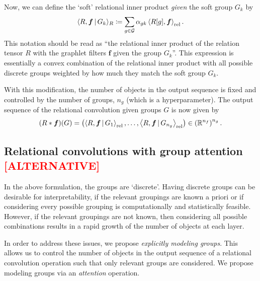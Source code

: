 Now, we can define the `soft' relational inner product \textit{given} the soft group $G_k$ by
\begin{equation}\label{eq:soft_relational_inner_prod}
    \langle R, \boldsymbol{f} \, \vert \, G_k \rangle_R \coloneqq \sum_{g \in {\mathcal{G}}} \alpha_{gk} \left \langle R[g], \boldsymbol{f} \right\rangle_\mathrm{rel}.
\end{equation}
This notation should be read as ``the relational inner product of the relation tensor $R$ with the graphlet filters $\boldsymbol{f}$ given the group $G_k$''. This expression is essentially a convex combination of the relational inner product with all possible discrete groups weighted by how much they match the soft group $G_k$.

With this modification, the number of objects in the output sequence is fixed and controlled by the number of groups, $n_g$ (which is a hyperparameter). The output sequence of the relational convolution given groups $G$ is now given by
\begin{equation}\label{eq:soft_relational_convolution_groups}
    (R \ast \bm{f})(G) = \left( \left\langle R, \bm{f} \, \vert \, G_1 \right\rangle_\mathrm{rel}, \ldots, \left\langle R, \bm{f} \, \vert \, G_{n_g} \right\rangle_\mathrm{rel} \right) \in \left(\mathbb{R}^{n_f}\right)^{n_g}.
\end{equation}

\subsection{Relational convolutions with group attention \textcolor{red}{[ALTERNATIVE]}}

In the above formulation, the groups are `discrete'. Having discrete groups can be desirable for interpretability, if the relevant groupings are known a priori or if considering every possible grouping is computationally and statistically feasible. However, if the relevant groupings are not known, then considering all possible combinations results in a rapid growth of the number of objects at each layer.

In order to address these issues, we propose \textit{explicitly modeling groups}. This allows us to control the number of objects in the output sequence of a relational convolution operation such that only relevant groups are considered. We propose modeling groups via an \textit{attention} operation.

